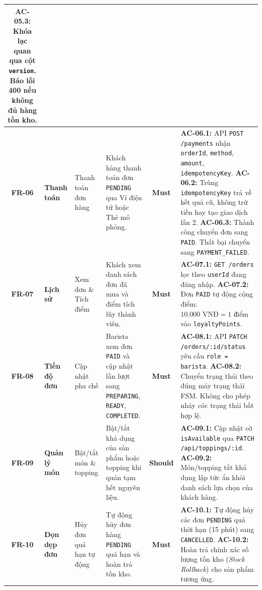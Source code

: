 \documentclass[12pt,a4paper]{article}
\begin{document}
\begin{xltabular}{\textwidth}{|c|>{\raggedright\arraybackslash}p{1.8cm}|>{\raggedright\arraybackslash}p{2.6cm}|>{\raggedright\arraybackslash}p{3cm}|c|>{\raggedright\arraybackslash}X|}
\textbf{AC-05.3:} Khóa lạc quan qua cột \texttt{version}. Báo lỗi 400 nếu không đủ hàng tồn kho. \\
\hline
\textbf{FR-06} & \textbf{Thanh toán} & Thanh toán đơn hàng & Khách hàng thanh toán đơn \texttt{PENDING} qua Ví điện tử hoặc Thẻ mô phỏng. & \textbf{Must} & 
\textbf{AC-06.1:} API \texttt{POST /payments} nhận \texttt{orderId}, \texttt{method}, \texttt{amount}, \texttt{idempotencyKey}.\newline
\textbf{AC-06.2:} Trùng \texttt{idempotencyKey} trả về kết quả cũ, không trừ tiền hay tạo giao dịch lần 2.\newline
\textbf{AC-06.3:} Thành công chuyển đơn sang \texttt{PAID}. Thất bại chuyển sang \texttt{PAYMENT\_FAILED}. \\
\hline
\textbf{FR-07} & \textbf{Lịch sử} & Xem đơn \& Tích điểm & Khách xem danh sách đơn đã mua và điểm tích lũy thành viên. & \textbf{Must} & 
\textbf{AC-07.1:} \texttt{GET /orders} lọc theo \texttt{userId} đang đăng nhập.\newline
\textbf{AC-07.2:} Đơn \texttt{PAID} tự động cộng điểm: $10.000\text{ VNĐ} = 1\text{ điểm}$ vào \texttt{loyaltyPoints}. \\
\hline
\textbf{FR-08} & \textbf{Tiến độ đơn} & Cập nhật pha chế & Barista xem đơn \texttt{PAID} và cập nhật lần lượt sang \texttt{PREPARING}, \texttt{READY}, \texttt{COMPLETED}. & \textbf{Must} & 
\textbf{AC-08.1:} API \texttt{PATCH /orders/:id/status} yêu cầu \texttt{role = barista}.\newline
\textbf{AC-08.2:} Chuyển trạng thái theo đúng máy trạng thái FSM. Không cho phép nhảy cóc trạng thái bất hợp lệ. \\
\hline
\textbf{FR-09} & \textbf{Quản lý món} & Bật/tắt món \& topping & Bật/tắt khả dụng của sản phẩm hoặc topping khi quán tạm hết nguyên liệu. & \textbf{Should} & 
\textbf{AC-09.1:} Cập nhật cờ \texttt{isAvailable} qua \texttt{PATCH /api/toppings/:id}.\newline
\textbf{AC-09.2:} Món/topping tắt khả dụng lập tức ẩn khỏi danh sách lựa chọn của khách hàng. \\
\hline
\textbf{FR-10} & \textbf{Dọn dẹp đơn} & Hủy đơn quá hạn tự động & Tự động hủy đơn hàng \texttt{PENDING} quá hạn và hoàn trả tồn kho. & \textbf{Must} & 
\textbf{AC-10.1:} Tự động hủy các đơn \texttt{PENDING} quá thời hạn (15 phút) sang \texttt{CANCELLED}.\newline
\textbf{AC-10.2:} Hoàn trả chính xác số lượng tồn kho (\textit{Stock Rollback}) cho sản phẩm tương ứng. \\

\end{xltabular}
\end{document}
